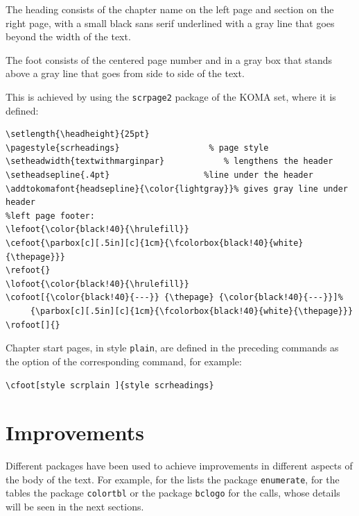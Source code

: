 \documentclass[a4paper,
                             twoside,
                             BCOR=1.0cm,
                             DIV=11,
                             parskip=full,
                             11pt]{scrbook}
\begin{document}
\begin{objectives}%
    \item  The heading consists of the chapter name on the left page and section on the right page, with a small black sans serif underlined with a gray line that goes beyond the width of the text.
    \item  The foot consists of the centered page number and in a gray box that stands above a gray line that goes from side to side of the text.
\end{objectives}
This is achieved by using the \verb+scrpage2+ package of the KOMA set, where it is defined:
\begin{tiny}
    \begin{verbatim}
\setlength{\headheight}{25pt}	      		   
\pagestyle{scrheadings}			         % page style
\setheadwidth{textwithmarginpar}	    	% lengthens the header
\setheadsepline{.4pt}					%line under the header
\addtokomafont{headsepline}{\color{lightgray}}% gives gray line under header
%left page footer:
\lefoot{\color{black!40}{\hrulefill}}
\cefoot{\parbox[c][.5in][c]{1cm}{\fcolorbox{black!40}{white}{\thepage}}}
\refoot{}
\lofoot{\color{black!40}{\hrulefill}}
\cofoot[{\color{black!40}{---}} {\thepage} {\color{black!40}{---}}]%
     {\parbox[c][.5in][c]{1cm}{\fcolorbox{black!40}{white}{\thepage}}}
\rofoot[]{}
\end{verbatim}
\end{tiny}
Chapter start pages, in style \verb+plain+, are defined in the preceding commands as the option of the corresponding command, for example:
\begin{scriptsize}\verb+\cfoot[style scrplain ]{style scrheadings}+\end{scriptsize}


\chapter{Improvements}\label{cap:improvements}

Different packages have been used to achieve improvements in different aspects of the body of the text. For example, for the lists the package \verb+enumerate+, for the tables the package \verb+colortbl+ or the package \verb+bclogo+ for the calls, whose details will be seen in the next sections.

\end{document}
